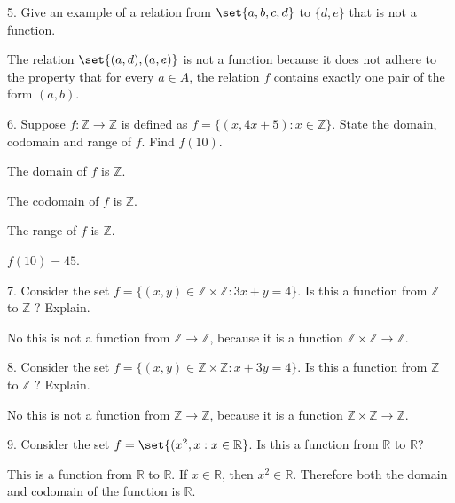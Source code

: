 \documentclass{hippoidC}
\begin{document}
\begin{prooflist}{5. Give an example of a relation from $\set{a, b, c, d}$ to
    $\{d, e\}$ that is not a function.}
\item The relation $\set{(a, d), (a, e)}$ is not a function because it does not
    adhere to the property that for every $a \in A$, the relation $f$ contains
    exactly one pair of the form $(a, b)$.
\end{prooflist}

\begin{prooflist}{6. Suppose $f: \mathbb{Z} \rightarrow \mathbb{Z}$ is defined
as $f=\{(x, 4 x+5): x \in \mathbb{Z}\}$. State the domain, codomain and
range of $f$. Find $f(10)$.}
\item The domain of $f$ is $\mathbb{Z}$.
\item The codomain of $f$ is $\mathbb{Z}$.
\item The range of $f$ is $\mathbb{Z}$.
\item $f(10)=45$.
\end{prooflist}

\begin{prooflist}{7. Consider the set $f=\{(x, y) \in \mathbb{Z} \times
    \mathbb{Z}: 3 x+y=4\}$. Is this a function from $\mathbb{Z}$ to $\mathbb{Z}$
? Explain.}
\item No this is not a function from $\mathbb{Z}\rightarrow\mathbb{Z}$, because
    it is a function $\mathbb{Z}\times\mathbb{Z}\rightarrow\mathbb{Z}$.
\end{prooflist}

\begin{prooflist}{8. Consider the set $f=\{(x, y) \in \mathbb{Z} \times
    \mathbb{Z}: x+3 y=4\}$. Is this a function from $\mathbb{Z}$ to $\mathbb{Z}$
? Explain.}
\item No this is not a function from $\mathbb{Z}\rightarrow\mathbb{Z}$, because
    it is a function $\mathbb{Z}\times\mathbb{Z}\rightarrow\mathbb{Z}$.
\end{prooflist}

\begin{prooflist}{9. Consider the set $f=\set{(x^2, x: x \in
    \mathbb{R}}$. Is this a function from $\mathbb{R}$ to $\mathbb{R}$?}
\item This is a function from $\mathbb{R}$ to $\mathbb{R}$. If $x\in \mathbb{R}$, then
    $x^2 \in \mathbb{R}$. Therefore both the domain and codomain of the function
    is $\mathbb{R}$.
\end{prooflist}
\end{document}
